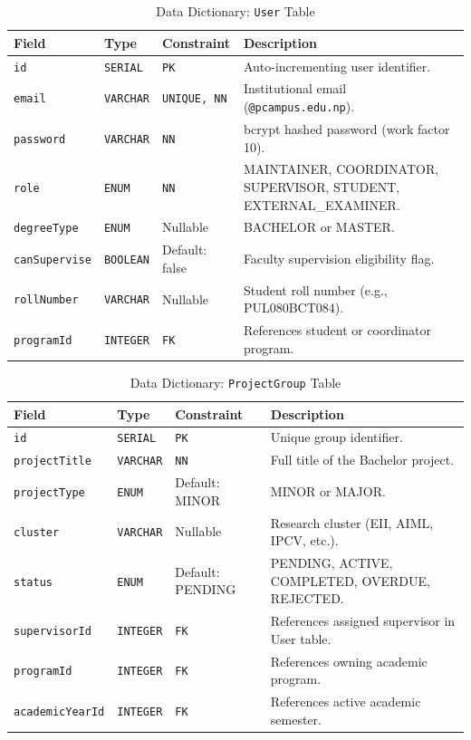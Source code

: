 \begin{table}[H]
\centering
\footnotesize
\caption{Data Dictionary: \texttt{User} Table}
\label{tab:schema_user}
\vspace{4pt}
\begin{tabularx}{\textwidth}{|l|l|l|X|}
\hline
\textbf{Field} & \textbf{Type} & \textbf{Constraint} & \textbf{Description} \\
\hline
\texttt{id} & \texttt{SERIAL} & \texttt{PK} & Auto-incrementing user identifier. \\
\texttt{email} & \texttt{VARCHAR} & \texttt{UNIQUE, NN} & Institutional email (\texttt{@pcampus.edu.np}). \\
\texttt{password} & \texttt{VARCHAR} & \texttt{NN} & bcrypt hashed password (work factor 10). \\
\texttt{role} & \texttt{ENUM} & \texttt{NN} & MAINTAINER, COORDINATOR, SUPERVISOR, STUDENT, EXTERNAL\_EXAMINER. \\
\texttt{degreeType} & \texttt{ENUM} & Nullable & BACHELOR or MASTER. \\
\texttt{canSupervise} & \texttt{BOOLEAN} & Default: false & Faculty supervision eligibility flag. \\
\texttt{rollNumber} & \texttt{VARCHAR} & Nullable & Student roll number (e.g., PUL080BCT084). \\
\texttt{programId} & \texttt{INTEGER} & \texttt{FK} & References student or coordinator program. \\
\hline
\end{tabularx}
\end{table}

\begin{table}[H]
\centering
\footnotesize
\caption{Data Dictionary: \texttt{ProjectGroup} Table}
\label{tab:schema_group}
\vspace{4pt}
\begin{tabularx}{\textwidth}{|l|l|l|X|}
\hline
\textbf{Field} & \textbf{Type} & \textbf{Constraint} & \textbf{Description} \\
\hline
\texttt{id} & \texttt{SERIAL} & \texttt{PK} & Unique group identifier. \\
\texttt{projectTitle} & \texttt{VARCHAR} & \texttt{NN} & Full title of the Bachelor project. \\
\texttt{projectType} & \texttt{ENUM} & Default: MINOR & MINOR or MAJOR. \\
\texttt{cluster} & \texttt{VARCHAR} & Nullable & Research cluster (EII, AIML, IPCV, etc.). \\
\texttt{status} & \texttt{ENUM} & Default: PENDING & PENDING, ACTIVE, COMPLETED, OVERDUE, REJECTED. \\
\texttt{supervisorId} & \texttt{INTEGER} & \texttt{FK} & References assigned supervisor in User table. \\
\texttt{programId} & \texttt{INTEGER} & \texttt{FK} & References owning academic program. \\
\texttt{academicYearId} & \texttt{INTEGER} & \texttt{FK} & References active academic semester. \\
\hline
\end{tabularx}
\end{table}

